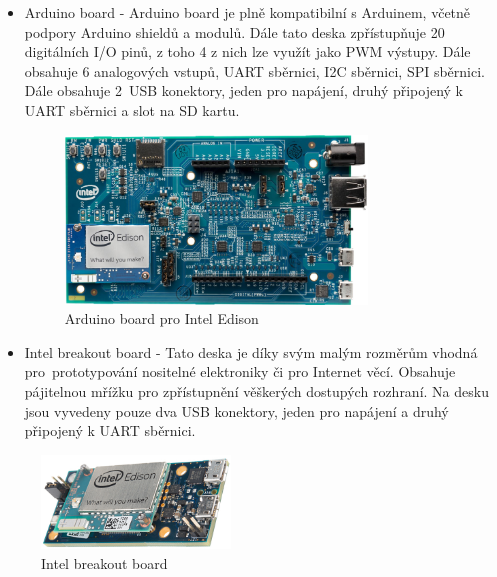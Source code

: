 			\begin{itemize}
				\item Arduino board - Arduino board je plně kompatibilní s Arduinem, včetně podpory Arduino shieldů a modulů. Dále tato deska zpřístupňuje 20 digitálních I/O pinů, z toho 4 z nich lze využít jako PWM výstupy. Dále obsahuje 6 analogových vstupů, UART sběrnici, I2C sběrnici, SPI sběrnici. Dále obsahuje 2~USB konektory, jeden pro napájení, druhý připojený k UART sběrnici a slot na SD kartu.
				
				\begin{figure}[!ht]
  \begin{center}
    \includegraphics[height=4.5cm]{obrazky/embed_intel_edison2}
  \end{center}
	\vspace{-20pt}
  \caption{Arduino board pro Intel Edison}
	\label{embed_intel_edison2}
	\vspace{-10pt}
\end{figure}
				
				\item Intel breakout board -  Tato deska je díky svým malým rozměrům vhodná pro~prototypování nositelné elektroniky či pro Internet věcí. Obsahuje pájitelnou mřížku pro zpřístupnění věškerých dostupých rozhraní. Na desku jsou vyvedeny pouze dva USB konektory, jeden pro napájení a druhý připojený k UART sběrnici.
\end{itemize}

\begin{figure}[!ht]
  \begin{center}
    \includegraphics[height=2.5cm]{obrazky/embed_intel_edison1}
  \end{center}
	\vspace{-20pt}
  \caption{Intel breakout board}
	\label{embed_intel_edison1}
	\vspace{-10pt}
\end{figure}

